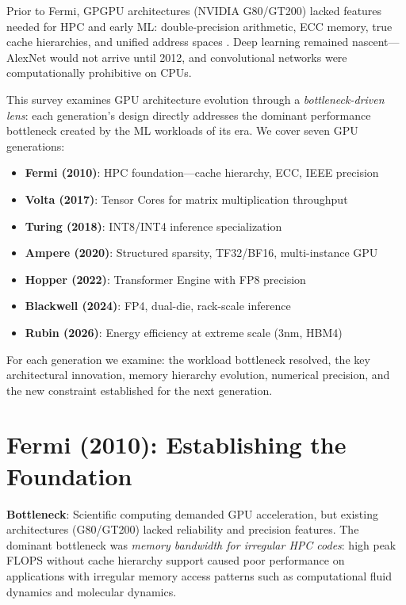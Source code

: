 \documentclass{article}
\begin{document}
Prior to Fermi, GPGPU architectures (NVIDIA G80/GT200) lacked features needed for HPC and early ML: double-precision arithmetic, ECC memory, true cache hierarchies, and unified address spaces \cite{nvidia2009fermi}. Deep learning remained nascent—AlexNet would not arrive until 2012, and convolutional networks were computationally prohibitive on CPUs.

This survey examines GPU architecture evolution through a \textit{bottleneck-driven lens}: each generation's design directly addresses the dominant performance bottleneck created by the ML workloads of its era. We cover seven GPU generations:
\begin{itemize}
\item \textbf{Fermi (2010)}: HPC foundation—cache hierarchy, ECC, IEEE precision
\item \textbf{Volta (2017)}: Tensor Cores for matrix multiplication throughput
\item \textbf{Turing (2018)}: INT8/INT4 inference specialization
\item \textbf{Ampere (2020)}: Structured sparsity, TF32/BF16, multi-instance GPU
\item \textbf{Hopper (2022)}: Transformer Engine with FP8 precision
\item \textbf{Blackwell (2024)}: FP4, dual-die, rack-scale inference
\item \textbf{Rubin (2026)}: Energy efficiency at extreme scale (3nm, HBM4)
\end{itemize}

For each generation we examine: the workload bottleneck resolved, the key architectural innovation, memory hierarchy evolution, numerical precision, and the new constraint established for the next generation.

\section{Fermi (2010): Establishing the Foundation}

\textbf{Bottleneck}: Scientific computing demanded GPU acceleration, but existing architectures (G80/GT200) lacked reliability and precision features. The dominant bottleneck was \textit{memory bandwidth for irregular HPC codes}: high peak FLOPS without cache hierarchy support caused poor performance on applications with irregular memory access patterns such as computational fluid dynamics and molecular dynamics.
\end{document}
